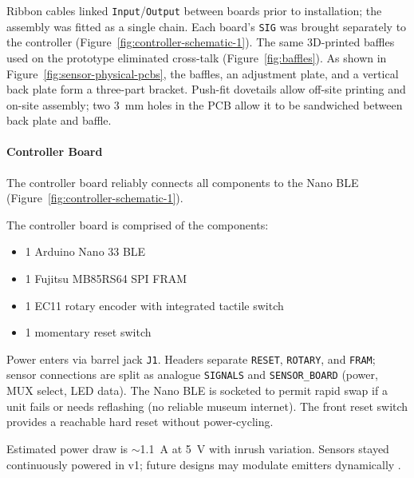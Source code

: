 Ribbon cables linked \texttt{Input}/\texttt{Output} between boards prior to installation; the assembly was fitted as a single chain. Each board’s \texttt{SIG} was brought separately to the controller (Figure~\ref{fig:controller-schematic-1}). The same 3D-printed baffles used on the prototype eliminated cross-talk (Figure~\ref{fig:baffles}). As shown in Figure~\ref{fig:sensor-physical-pcbs}, the baffles, an adjustment plate, and a vertical back plate form a three-part bracket. Push-fit dovetails allow off-site printing and on-site assembly; two 3~mm holes in the PCB allow it to be sandwiched between back plate and baffle.

\paragraph{Controller Board}

The controller board reliably connects all components to the Nano BLE (Figure~\ref{fig:controller-schematic-1}). 

The controller board is comprised of the components:

\begin{itemize}[itemsep=0pt, parsep=0pt, topsep=1em, partopsep=0pt]
    \item 1 Arduino Nano 33 BLE
    \item 1 Fujitsu MB85RS64 SPI FRAM
    \item 1 EC11 rotary encoder with integrated tactile switch
    \item 1 momentary reset switch
\end{itemize}

Power enters via barrel jack \texttt{J1}. Headers separate \texttt{RESET}, \texttt{ROTARY}, and \texttt{FRAM}; sensor connections are split as analogue \texttt{SIGNALS} and \texttt{SENSOR\_BOARD} (power, MUX select, LED data). The Nano BLE is socketed to permit rapid swap if a unit fails or needs reflashing (no reliable museum internet). The front reset switch provides a reachable hard reset without power-cycling.


Estimated power draw is $\sim$1.1~A at 5~V with inrush variation. Sensors stayed continuously powered in v1; future designs may modulate emitters dynamically \cite{mcpherson_portable_2013}.

